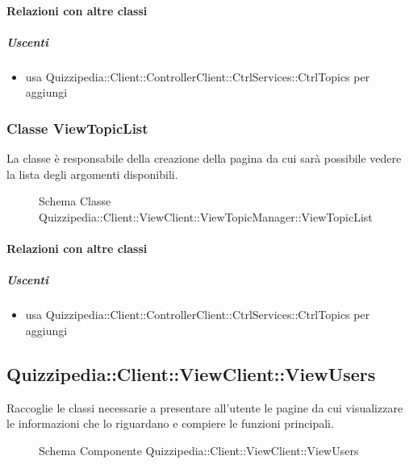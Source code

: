 \paragraph{Relazioni con altre classi}
\subparagraph{Uscenti}
\begin{itemize}
\item usa Quizzipedia::Client::ControllerClient::CtrlServices::CtrlTopics per aggiungi
\end{itemize}
\subsubsection{Classe ViewTopicList}
La classe è responsabile della creazione della pagina da cui sarà possibile vedere la lista degli argomenti disponibili.
\begin{figure}[H]
\centering
\noindent{}
\caption[Schema Classe ViewTopicList]{Schema Classe Quizzipedia::Client::ViewClient::ViewTopicManager::ViewTopicList}
\end{figure}
\paragraph{Relazioni con altre classi}
\subparagraph{Uscenti}
\begin{itemize}
\item usa Quizzipedia::Client::ControllerClient::CtrlServices::CtrlTopics per aggiungi
\end{itemize}
\subsection{Quizzipedia::Client::ViewClient::ViewUsers}
Raccoglie le classi necessarie a presentare all'utente le pagine da cui visualizzare le informazioni che lo riguardano e compiere le funzioni principali.
\begin{figure}[H]
\centering
\noindent{}
\caption[Schema Componente Quizzipedia::Client::ViewClient::ViewUsers]{Schema Componente Quizzipedia::Client::ViewClient::ViewUsers}
\end{figure}
